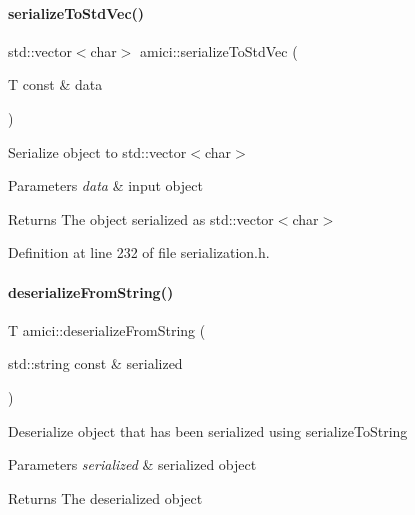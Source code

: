 \mbox{\label{namespaceamici_ad5b38b6ae6007acbaf43521f2a616937}} 
\paragraph{\texorpdfstring{serialize\+To\+Std\+Vec()}{serializeToStdVec()}}
{\footnotesize\ttfamily std\+::vector$<$char$>$ amici\+::serialize\+To\+Std\+Vec (\begin{DoxyParamCaption}\item[{T const \&}]{data }\end{DoxyParamCaption})}

Serialize object to std\+::vector$<$char$>$


\begin{DoxyParams}{Parameters}
{\em data} & input object\\
\hline
\end{DoxyParams}
\begin{DoxyReturn}{Returns}
The object serialized as std\+::vector$<$char$>$
\end{DoxyReturn}


Definition at line 232 of file serialization.\+h.

\mbox{\label{namespaceamici_a863d35f9934623bc5f7f409a05fa0d67}} 
\paragraph{\texorpdfstring{deserialize\+From\+String()}{deserializeFromString()}}
{\footnotesize\ttfamily T amici\+::deserialize\+From\+String (\begin{DoxyParamCaption}\item[{std\+::string const \&}]{serialized }\end{DoxyParamCaption})}

Deserialize object that has been serialized using serialize\+To\+String


\begin{DoxyParams}{Parameters}
{\em serialized} & serialized object\\
\hline
\end{DoxyParams}
\begin{DoxyReturn}{Returns}
The deserialized object
\end{DoxyReturn}


